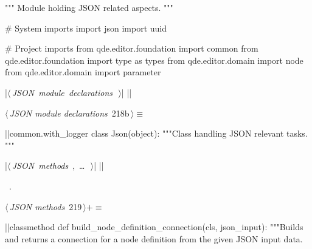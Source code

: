 \documentclass[%
    a4paper,    %
    justified,  %
    nobib,      %
    openany     %
]{tufte-book}
\makeatletter
\renewcommand{\label}[1]{\@tufte@label{##1}}%
\makeatother
\begin{document}
\begin{fullwidth}
\begin{flushleft}
\begin{minipage}{\linewidth}
\begin{pythoncode}
""" Module holding JSON related aspects.
"""

# System imports
import json
import uuid

# Project imports
from qde.editor.foundation import common
from qde.editor.foundation import type as types
from qde.editor.domain import node
from qde.editor.domain import parameter


|\hbox{$\langle\,${\itshape JSON module declarations}\nobreak\ {\footnotesize {}}$\,\rangle$}|
|\NWsep|
\end{pythoncode}
\vspace{1.5ex}
\footnotesize
\begin{list}{}{\setlength{\itemsep}{-\parsep}\setlength{\itemindent}{-\leftmargin}}

\item{}
\end{list}
\end{minipage}\vspace{4ex}
\end{flushleft}
\begin{flushleft} \small
\begin{minipage}{\linewidth}\label{scrap223}\raggedright\small
{} $\langle\,${\itshape JSON module declarations}\nobreak\ {\footnotesize {218b}}$\,\rangle\equiv$
\vspace{-1ex}
\begin{pythoncode}
|\normalfont{}\fontfamily{}|common.with_logger
class Json(object):
    """Class handling JSON relevant tasks.
    """

    |\hbox{$\langle\,${\itshape JSON methods}\nobreak\ {\footnotesize {}, \ldots\ }$\,\rangle$}|
|\NWsep|
\end{pythoncode}
\vspace{1.5ex}
\footnotesize
\begin{list}{}{\setlength{\itemsep}{-\parsep}\setlength{\itemindent}{-\leftmargin}}
\item \NWtxtMacroRefIn\ .

\item{}
\end{list}
\end{minipage}\vspace{4ex}
\end{flushleft}
\begin{flushleft} \small
\begin{minipage}{\linewidth}\label{scrap224}\raggedright\small
{} $\langle\,${\itshape JSON methods}\nobreak\ {\footnotesize {219}}$\,\rangle+\equiv$
\vspace{-1ex}
\begin{pythoncode}
|\normalfont{}\fontfamily{}|classmethod
def build_node_definition_connection(cls, json_input):
    """Builds and returns a connection for a node definition from the given
    JSON input data.


\end{pythoncode}
\end{minipage}
\end{flushleft}
\end{fullwidth}
\end{document}
